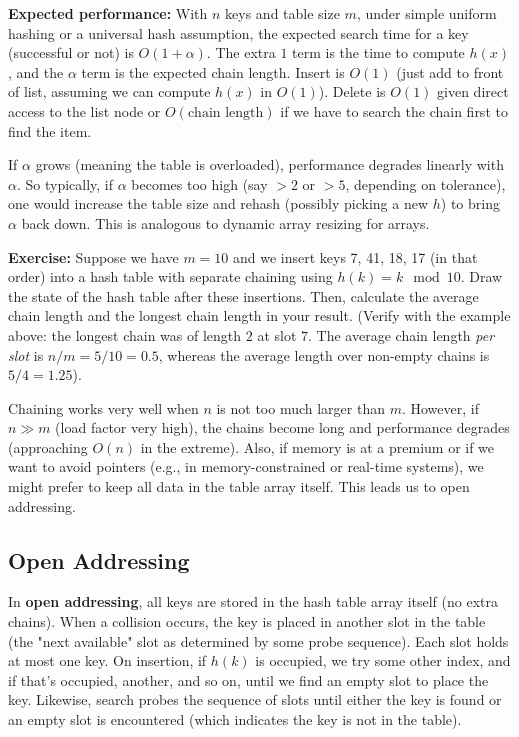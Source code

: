 \documentclass[11pt]{article}
\begin{document}
\textbf{Expected performance:} With $n$ keys and table size $m$, under simple uniform hashing or a universal hash assumption, the expected search time for a key (successful or not) is $O(1 + \alpha)$. The extra $1$ term is the time to compute $h(x)$, and the $\alpha$ term is the expected chain length. Insert is $O(1)$ (just add to front of list, assuming we can compute $h(x)$ in $O(1)$). Delete is $O(1)$ given direct access to the list node or $O(\text{chain length})$ if we have to search the chain first to find the item.

If $\alpha$ grows (meaning the table is overloaded), performance degrades linearly with $\alpha$. So typically, if $\alpha$ becomes too high (say $> 2$ or $> 5$, depending on tolerance), one would increase the table size and rehash (possibly picking a new $h$) to bring $\alpha$ back down. This is analogous to dynamic array resizing for arrays.

\textbf{Exercise:} Suppose we have $m=10$ and we insert keys 7, 41, 18, 17 (in that order) into a hash table with separate chaining using $h(k)=k \mod 10$. Draw the state of the hash table after these insertions. Then, calculate the average chain length and the longest chain length in your result. (Verify with the example above: the longest chain was of length $2$ at slot $7$. The average chain length \emph{per slot} is $n/m=5/10=0.5$, whereas the average length over non-empty chains is $5/4=1.25$).

Chaining works very well when $n$ is not too much larger than $m$. However, if $n \gg m$ (load factor very high), the chains become long and performance degrades (approaching $O(n)$ in the extreme). Also, if memory is at a premium or if we want to avoid pointers (e.g., in memory-constrained or real-time systems), we might prefer to keep all data in the table array itself. This leads us to open addressing.

\subsection{Open Addressing}
In \textbf{open addressing}, all keys are stored in the hash table array itself (no extra chains). When a collision occurs, the key is placed in another slot in the table (the "next available" slot as determined by some probe sequence). Each slot holds at most one key. On insertion, if $h(k)$ is occupied, we try some other index, and if that’s occupied, another, and so on, until we find an empty slot to place the key. Likewise, search probes the sequence of slots until either the key is found or an empty slot is encountered (which indicates the key is not in the table).
\end{document}
